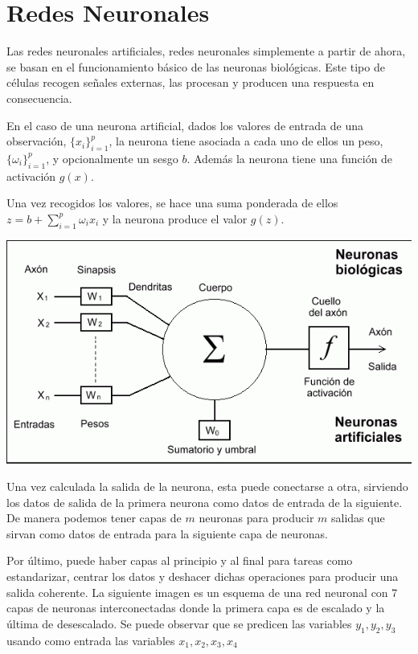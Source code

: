 \section{Redes Neuronales}

\noindent Las redes neuronales artificiales, redes neuronales simplemente a partir de ahora, se basan en el funcionamiento básico de las neuronas biológicas. Este tipo de células recogen señales externas, las procesan y producen una respuesta en consecuencia. 

\noindent En el caso de una neurona artificial, dados los valores de entrada de una observación, $\lbrace x_i\rbrace_{i=1}^p$, la neurona tiene asociada a cada uno de ellos un peso, $\lbrace \omega_i\rbrace_{i=1}^p$, y opcionalmente un sesgo $b$. Además la neurona tiene una función de activación $g(x)$. 

\noindent Una vez recogidos los valores, se hace una suma ponderada de ellos $z=b+\sum_{i=1}^p \omega_i x_i$ y la neurona produce el valor $g(z)$.

\begin{center}
\includegraphics[scale=0.65]{Documentos Extra/neurona.png}
\end{center}

\noindent Una vez calculada la salida de la neurona, esta puede conectarse a otra, sirviendo los datos de salida de la primera neurona como datos de entrada de la siguiente. De manera  podemos tener capas de $m$ neuronas para producir $m$ salidas que sirvan como datos de entrada para la siguiente capa de neuronas.

\noindent Por último, puede haber capas al principio y al final para tareas como estandarizar, centrar los datos y deshacer dichas operaciones para producir una salida coherente. 
\newpage
\noindent La siguiente imagen es un esquema de una red neuronal con 7 capas de neuronas interconectadas donde la primera capa es de escalado y la última de desescalado. Se puede observar que se predicen las variables $y_1, y_2, y_3$ usando como entrada las variables $x_1,x_2,x_3,x_4$ 

